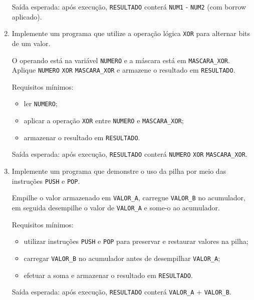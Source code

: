 \documentclass[12pt,a4paper]{article}
\begin{document}
\begin{enumerate}[left=0pt,label=\textbf{Exercício \arabic*:},itemsep=8pt]
Saída esperada: após execução, \texttt{RESULTADO} conterá \texttt{NUM1} - \texttt{NUM2} (com borrow aplicado).

\item Implemente um programa que utilize a operação lógica \texttt{XOR} para alternar bits de um valor.

O operando está na variável \texttt{NUMERO} e a máscara está em \texttt{MASCARA\_XOR}. Aplique \texttt{NUMERO} \texttt{XOR} \texttt{MASCARA\_XOR} e armazene o resultado em \texttt{RESULTADO}.

Requisitos mínimos:
\begin{itemize}
	\item ler \texttt{NUMERO};
	\item aplicar a operação \texttt{XOR} entre \texttt{NUMERO} e \texttt{MASCARA\_XOR};
	\item armazenar o resultado em \texttt{RESULTADO}.
\end{itemize}

Saída esperada: após execução, \texttt{RESULTADO} conterá \texttt{NUMERO} \texttt{XOR} \texttt{MASCARA\_XOR}.

\item Implemente um programa que demonstre o uso da pilha por meio das instruções \texttt{PUSH} e \texttt{POP}.

Empilhe o valor armazenado em \texttt{VALOR\_A}, carregue \texttt{VALOR\_B} no acumulador, em seguida desempilhe o valor de \texttt{VALOR\_A} e some-o ao acumulador.

Requisitos mínimos:
\begin{itemize}
	\item utilizar instruções \texttt{PUSH} e \texttt{POP} para preservar e restaurar valores na pilha;
	\item carregar \texttt{VALOR\_B} no acumulador antes de desempilhar \texttt{VALOR\_A};
	\item efetuar a soma e armazenar o resultado em \texttt{RESULTADO}.
\end{itemize}

Saída esperada: após execução, \texttt{RESULTADO} conterá \texttt{VALOR\_A} + \texttt{VALOR\_B}.
\end{enumerate}
\end{document}
